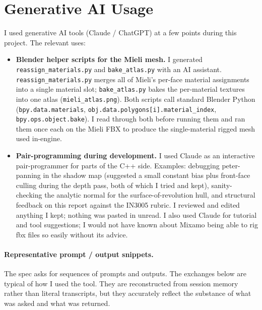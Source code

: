 \documentclass[11pt,a4paper]{article}
\begin{document}
\section{Generative AI Usage}

I used generative AI tools (Claude / ChatGPT) at a few points during this
project. The relevant uses:

\begin{itemize}
  \item \textbf{Blender helper scripts for the Mieli mesh.} I generated
        \texttt{reassign\_materials.py} and \texttt{bake\_atlas.py} with an
        AI assistant. \texttt{reassign\_materials.py} merges all of Mieli's
        per-face material assignments into a single material slot;
        \texttt{bake\_atlas.py} bakes the per-material textures into one
        atlas (\texttt{mieli\_atlas.png}). Both scripts call standard
        Blender Python (\texttt{bpy.data.materials},
        \texttt{obj.data.polygons[i].material\_index},
        \texttt{bpy.ops.object.bake}). I read through both before running
        them and ran them once each on the Mieli FBX to produce the
        single-material rigged mesh used in-engine.
  \item \textbf{Pair-programming during development.} I used Claude as an
        interactive pair-programmer for parts of the C++ side. Examples:
        debugging peter-panning in the shadow map (suggested a small
        constant bias plus front-face culling during the depth pass, both
        of which I tried and kept), sanity-checking the analytic normal
        for the surface-of-revolution hull, and structural feedback on
        this report against the IN3005 rubric. I reviewed and edited
        anything I kept; nothing was pasted in unread. I also used Claude
        for tutorial and tool suggestions; I would not have known about
        Mixamo being able to rig fbx files so easily without its advice.
\end{itemize}

\paragraph{Representative prompt / output snippets.}
The spec asks for sequences of prompts and outputs. The exchanges below
are typical of how I used the tool. They are reconstructed from
session memory rather than literal transcripts, but they accurately
reflect the substance of what was asked and what was returned.
\end{document}
